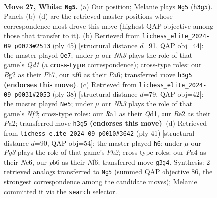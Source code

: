 \documentclass[11pt]{article}
\begin{document}
\begin{figure}[p]
\label{fig:thought-m50}
\end{figure}

\clearpage

\begin{figure}[p]\centering
\begin{subfigure}{0.46\textwidth}\centering
\resizebox{\linewidth}{!}{%
\newchessgame
\chessboard[
  setfen={2b5/2q2pkp/rp3np1/8/PpN5/1P4PN/4RPBP/R5K1 w - - 4 27},
  showmover=false,
  pgfstyle=straightmove, color=movearrow, markmove={h3-g5}
]}
\caption{}
\end{subfigure}\hfill
\begin{subfigure}{0.46\textwidth}\centering
\resizebox{\linewidth}{!}{%
\newchessgame
\chessboard[
  setfen={3q2k1/1p3ppp/pbr1pn2/8/4P3/2B3P1/PP2QPBP/3R2K1 b - - 1 23},
  showmover=false,
  pgfstyle=straightmove, color=movearrow, markmove={d8-e7}
]}
\caption{}
\end{subfigure}
\\[4pt]
\begin{subfigure}{0.46\textwidth}\centering
\resizebox{\linewidth}{!}{%
\newchessgame
\chessboard[
  setfen={6k1/pp3rpp/n1p1p2q/2b5/7P/2B2NR1/PP3PP1/1K1Q4 w - - 1 20},
  showmover=false,
  pgfstyle=straightmove, color=movearrow, markmove={f3-e5}
]}
\caption{}
\end{subfigure}\hfill
\begin{subfigure}{0.46\textwidth}\centering
\resizebox{\linewidth}{!}{%
\newchessgame
\chessboard[
  setfen={2r3k1/5ppp/2n1pn2/3p4/1q6/4PN2/1BQ2PPP/2R3K1 b - - 7 21},
  showmover=false,
  pgfstyle=straightmove, color=movearrow, markmove={h7-h6}
]}
\caption{}
\end{subfigure}
\caption{\textbf{Move 27, White: \texttt{Ng5}.} (a) Our position; Melanie plays \texttt{Ng5} (\texttt{h3g5}). Panels (b)--(d) are the retrieved master positions whose correspondence most drove this move (highest QAP objective among those that transfer to it). (b) Retrieved from \texttt{lichess\_elite\_2024-09\_p0023\#2513} (ply 45) [structural distance $d$=91, QAP obj=44]: the master played \texttt{Qe7}; under $\mu$ our \emph{Nh3} plays the role of that game's \emph{Qd1} (a \textbf{cross-type} correspondence); cross-type roles: our \emph{B}g2 as their \emph{P}h7, our \emph{n}f6 as their \emph{P}a6; transferred move \texttt{h3g5} \textbf{(endorses this move)}. (c) Retrieved from \texttt{lichess\_elite\_2024-09\_p0031\#2053} (ply 38) [structural distance $d$=79, QAP obj=42]: the master played \texttt{Ne5}; under $\mu$ our \emph{Nh3} plays the role of that game's \emph{Nf3}; cross-type roles: our \emph{R}a1 as their \emph{Q}d1, our \emph{R}e2 as their \emph{P}a2; transferred move \texttt{h3g5} \textbf{(endorses this move)}. (d) Retrieved from \texttt{lichess\_elite\_2024-09\_p0010\#3642} (ply 41) [structural distance $d$=90, QAP obj=54]: the master played \texttt{h6}; under $\mu$ our \emph{Pg3} plays the role of that game's \emph{Ph2}; cross-type roles: our \emph{P}a4 as their \emph{N}c6, our \emph{p}b6 as their \emph{N}f6; transferred move \texttt{g3g4}. Synthesis: 2 retrieved analogs transferred to \texttt{Ng5} (summed QAP objective 86, the strongest correspondence among the candidate moves); Melanie committed it via the \texttt{search} selector.}

\end{figure}
\end{document}
